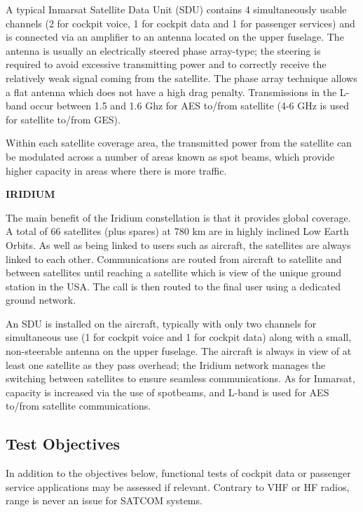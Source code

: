 \documentclass[
]{book}
\begin{document}
A typical Inmarsat Satellite Data Unit (SDU) contains 4 simultaneously usable
channels (2 for cockpit voice, 1 for cockpit data and 1 for passenger services)
and is connected via an amplifier to an antenna located on the upper fuselage.
The antenna is usually an electrically steered phase array-type; the steering
is required to avoid excessive transmitting power and to correctly receive the
relatively weak signal coming from the satellite. The phase array technique
allows a flat antenna which does not have a high drag penalty. Transmissions in
the L-band occur between 1.5 and 1.6 Ghz for AES to/from satellite (4-6 GHz is
used for satellite to/from GES).

Within each satellite coverage area, the transmitted power from the satellite
can be modulated across a number of areas known as spot beams, which provide
higher capacity in areas where there is more traffic.

\textbf{IRIDIUM}

The main benefit of the Iridium constellation is that it provides global
coverage. A total of 66 satellites (plus spares) at 780 km are in highly
inclined Low Earth Orbits. As well as being linked to users such as aircraft,
the satellites are always linked to each other. Communications are routed from
aircraft to satellite and between satellites until reaching a satellite which
is view of the unique ground station in the USA. The call is then routed to the
final user using a dedicated ground network.

An SDU is installed on the aircraft, typically with only two channels for
simultaneous use (1 for cockpit voice and 1 for cockpit data) along with a
small, non-steerable antenna on the upper fuselage. The aircraft is always in
view of at least one satellite as they pass overhead; the Iridium network
manages the switching between satellites to ensure seamless communications. As
for Inmarsat, capacity is increased via the use of spotbeams, and L-band is
used for AES to/from satellite communications.

\hypertarget{test-objectives-2}{%
\subsection{Test Objectives}\label{test-objectives-2}}

In addition to the objectives below, functional tests of cockpit data or
passenger service applications may be assessed if relevant. Contrary to VHF or
HF radios, range is never an issue for SATCOM systems.
\end{document}
